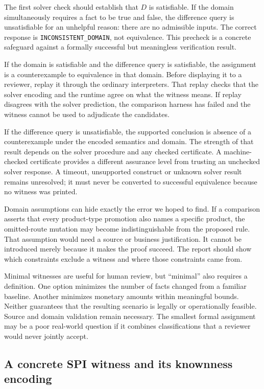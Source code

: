 \documentclass[12pt,a4paper,oneside,openany]{book}
\begin{document}
The first solver check should establish that $D$ is satisfiable. If the domain
simultaneously requires a fact to be true and false, the difference query is
unsatisfiable for an unhelpful reason: there are no admissible inputs. The
correct response is \texttt{INCONSISTENT\_DOMAIN}, not equivalence. This
precheck is a concrete safeguard against a formally successful but meaningless
verification result.

If the domain is satisfiable and the difference query is satisfiable, the
assignment is a counterexample to equivalence in that domain. Before displaying
it to a reviewer, replay it through the ordinary interpreters. That replay
checks that the solver encoding and the runtime agree on what the witness
means. If replay disagrees with the solver prediction, the comparison harness
has failed and the witness cannot be used to adjudicate the candidates.

If the difference query is unsatisfiable, the supported conclusion is absence
of a counterexample under the encoded semantics and domain. The strength of
that result depends on the solver procedure and any checked certificate. A
machine-checked certificate provides a different assurance level from trusting
an unchecked solver response. A timeout, unsupported construct or unknown
solver result remains unresolved; it must never be converted to successful
equivalence because no witness was printed.

Domain assumptions can hide exactly the error we hoped to find. If a comparison
asserts that every product-type promotion also names a specific product, the
omitted-route mutation may become indistinguishable from the proposed rule.
That assumption would need a source or business justification. It cannot be
introduced merely because it makes the proof succeed. The report should show
which constraints exclude a witness and where those constraints came from.

Minimal witnesses are useful for human review, but ``minimal'' also requires a
definition. One option minimizes the number of facts changed from a familiar
baseline. Another minimizes monetary amounts within meaningful bounds. Neither
guarantees that the resulting scenario is legally or operationally feasible.
Source and domain validation remain necessary. The smallest formal assignment
may be a poor real-world question if it combines classifications that a reviewer
would never jointly accept.

\subsection{A concrete SPI witness and its knownness encoding}
\label{merge:P-03-product:06}
\end{document}
